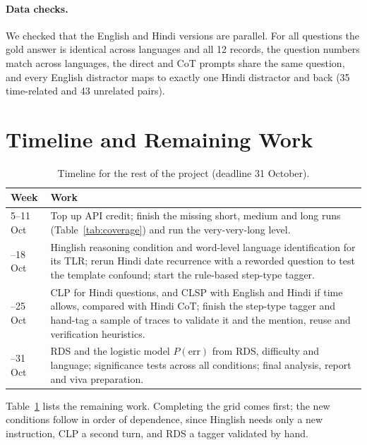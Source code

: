 \documentclass[11pt]{article}
\begin{document}
\paragraph{Data checks.}
We checked that the English and Hindi versions are parallel. For all \NQuestions{} questions the gold answer is identical across languages and all 12 records, the question numbers match across languages, the direct and CoT prompts share the same question, and every English distractor maps to exactly one Hindi distractor and back (35 time-related and 43 unrelated pairs).



\section{Timeline and Remaining Work}
\label{sec:timeline}

\begin{table}[t]
\centering
\small
\setlength{\tabcolsep}{4pt}
\begin{tabular}{@{}lp{5.6cm}@{}}
\toprule
Week & Work \\
\midrule
5--11 Oct & Top up API credit; finish the missing short, medium and long runs (Table~\ref{tab:coverage}) and run the very-very-long level. \\
\addlinespace[5pt]
12--18 Oct & Hinglish reasoning condition and word-level language identification for its TLR; rerun Hindi date recurrence with a reworded question to test the template confound; start the rule-based step-type tagger. \\
\addlinespace[5pt]
19--25 Oct & CLP for Hindi questions, and CLSP with English and Hindi if time allows, compared with Hindi CoT; finish the step-type tagger and hand-tag a sample of traces to validate it and the mention, reuse and verification heuristics. \\
\addlinespace[5pt]
26--31 Oct & RDS and the logistic model $P(\mathrm{err})$ from RDS, difficulty and language; significance tests across all conditions; final analysis, report and viva preparation. \\
\bottomrule
\end{tabular}
\caption{Timeline for the rest of the project (deadline 31 October).}
\label{tab:timeline}
\end{table}

Table~\ref{tab:timeline} lists the remaining work. Completing the grid comes first; the new conditions follow in order of dependence, since Hinglish needs only a new instruction, CLP a second turn, and RDS a tagger validated by hand. 
\end{document}
